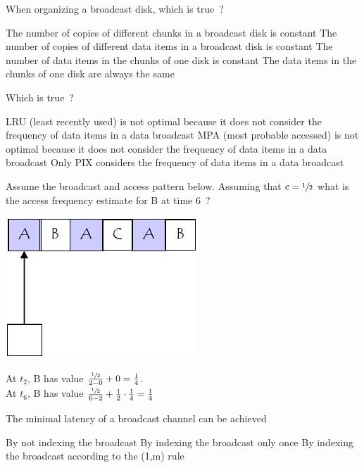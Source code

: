 \documentclass[12pt,a4paper]{exam} %
\begin{document}
\begin{flushleft}
\begin{multicols*}{2}
\begin{questions}
\question When organizing a broadcast disk, which is true~?
\begin{checkboxes}
\CorrectChoice The number of copies of different chunks in a broadcast disk is constant
\choice The number of copies of different data items in a broadcast disk is constant
\CorrectChoice The number of data items in the chunks of one disk is constant
\choice The data items in the chunks of one disk are always the same
\end{checkboxes}

\question Which is true~?
\begin{checkboxes}
\CorrectChoice LRU (least recently used) is not optimal because it does not consider the frequency of data items in a data broadcast
\CorrectChoice MPA (most probable accessed) is not optimal because it does not consider the frequency of data items in a data broadcast
\CorrectChoice Only PIX considers the frequency of data items in a data broadcast
\end{checkboxes}

\question Assume the broadcast and access pattern below. Assuming that $c=\sfrac{1}{2}$ what is the access frequency estimate for B at time 6~?
\begin{colfig}
\centering
\includegraphics[scale=0.75]{w9_s49}
\end{colfig}
\begin{checkboxes}
\choice {}
\CorrectChoice {}
\choice {}
\choice {}
\end{checkboxes}
\begin{solution}

At $t_2$, B has value $\frac{\sfrac{1}{2}}{2-0}+0 = \frac{1}{4}$.\\
At $t_6$, B has value $\frac{\sfrac{1}{2}}{6-2}+\frac{1}{2}\cdot\frac{1}{4} = \frac{1}{4}$
\end{solution}

\question The minimal latency of a broadcast channel can be achieved
\begin{checkboxes}
\CorrectChoice By not indexing the broadcast
\choice By indexing the broadcast only once
\choice By indexing the broadcast according to the (1,m) rule
\end{checkboxes}


\end{questions}
\end{multicols*}
\end{flushleft}
\end{document}
